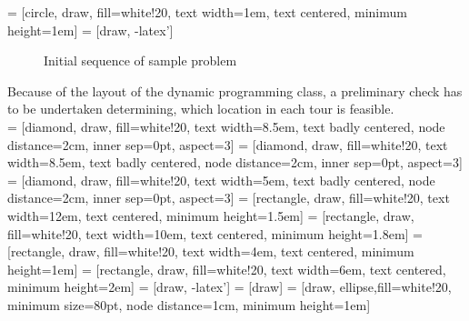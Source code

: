 \documentclass[final,5p,times,twocolumn]{elsarticle}
\begin{document}
{{ = [circle, draw, fill=white!20, 
    text width=1em, text centered, minimum height=1em]
 = [draw, -latex']
\begin{figure}[!h]
\centering
{}
\caption{Initial sequence of sample problem}
\label{fig:map}
\end{figure}

Because of the layout of the dynamic programming class, a preliminary check has to be undertaken determining, which location in each tour is feasible. \\ 

 = [diamond, draw, fill=white!20, 
    text width=8.5em, text badly centered, node distance=2cm, inner sep=0pt, aspect=3]
 = [diamond, draw, fill=white!20, 
    text width=8.5em, text badly centered, node distance=2cm, inner sep=0pt, aspect=3]
 = [diamond, draw, fill=white!20, 
    text width=5em, text badly centered, node distance=2cm, inner sep=0pt, aspect=3]
 = [rectangle, draw, fill=white!20, 
    text width=12em, text centered, minimum height=1.5em]
 = [rectangle, draw, fill=white!20, 
    text width=10em, text centered, minimum height=1.8em]
 = [rectangle, draw, fill=white!20, 
    text width=4em, text centered, minimum height=1em]
 = [rectangle, draw, fill=white!20, 
    text width=6em, text centered, minimum height=2em]
 = [draw, -latex']
 = [draw]
 = [draw, ellipse,fill=white!20, minimum size=80pt, node distance=1cm, minimum height=1em]
   
}}
\end{document}
